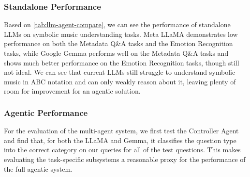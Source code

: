 \documentclass[sigconf]{acmart}
\begin{document}
\subsubsection{Standalone Performance}
Based on \autoref{tab:llm-agent-compare}, we can see the performance of standalone LLMs on symbolic music understanding tasks. Meta LLaMA demonstrates low performance on both the Metadata Q\&A tasks and the Emotion Recognition tasks, while Google Gemma performs well on the Metadata Q\&A tasks and shows much better performance on the Emotion Recognition tasks, though still not ideal. We can see that current LLMs still struggle to understand symbolic music in ABC notation and can only weakly reason about it, leaving plenty of room for improvement for an agentic solution.

\begin{table}[H]
\centering
{}
\caption{Comparison of standalone LLM accuracy vs. agentic performance on two ABC-Eval tasks.}
\label{tab:llm-agent-compare}
\end{table}

\subsubsection{Agentic Performance}
For the evaluation of the multi-agent system, we first test the Controller Agent and find that, for both the LLaMA and Gemma, it classifies the question type into the correct category on our queries for all of the test questions. This makes evaluating the task-specific subsystems a reasonable proxy for the performance of the full agentic system.
\end{document}
